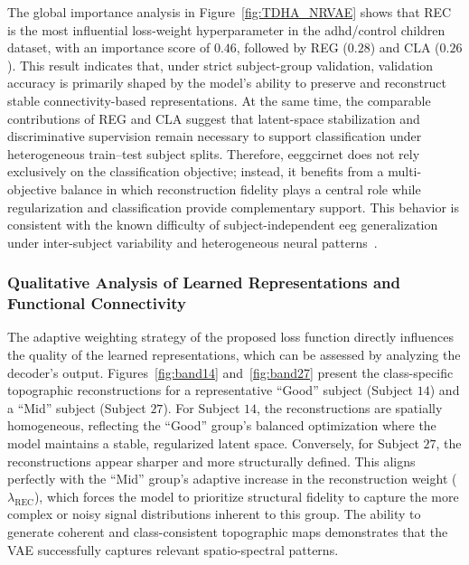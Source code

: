 {The global importance analysis in Figure~\ref{fig:TDHA_NRVAE} shows that REC is the most influential loss-weight hyperparameter in the \gls{adhd}/control children dataset, with an importance score of $0.46$, followed by REG ($0.28$) and CLA ($0.26$). This result indicates that, under strict subject-group validation, validation accuracy is primarily shaped by the model's ability to preserve and reconstruct stable connectivity-based representations. At the same time, the comparable contributions of REG and CLA suggest that latent-space stabilization and discriminative supervision remain necessary to support classification under heterogeneous train--test subject splits. Therefore, \gls{eeggcirnet} does not rely exclusively on the classification objective; instead, it benefits from a multi-objective balance in which reconstruction fidelity plays a central role while regularization and classification provide complementary support. This behavior is consistent with the known difficulty of subject-independent \gls{eeg} generalization under inter-subject variability and heterogeneous neural patterns~\cite{lotte2018review,saha2020intra,lenartowicz2018adhd}.}

\subsubsection{Qualitative Analysis of Learned Representations and Functional Connectivity}

The adaptive weighting strategy of the proposed loss function directly influences the quality of the learned representations, which can be assessed by analyzing the decoder's output. Figures~\ref{fig:band14} and~\ref{fig:band27} present the class-specific topographic reconstructions for a representative ``Good'' subject (Subject $14$) and a ``Mid'' subject (Subject $27$). For Subject $14$, the reconstructions are spatially homogeneous, reflecting the ``Good'' group's balanced optimization where the model maintains a stable, regularized latent space. Conversely, for Subject $27$, the reconstructions appear sharper and more structurally defined. This aligns perfectly with the ``Mid'' group's adaptive increase in the reconstruction weight ($\lambda_{\text{REC}}$), which forces the model to prioritize structural fidelity to capture the more complex or noisy signal distributions inherent to this group. The ability to generate coherent and class-consistent topographic maps demonstrates that the VAE successfully captures relevant spatio-spectral patterns.

